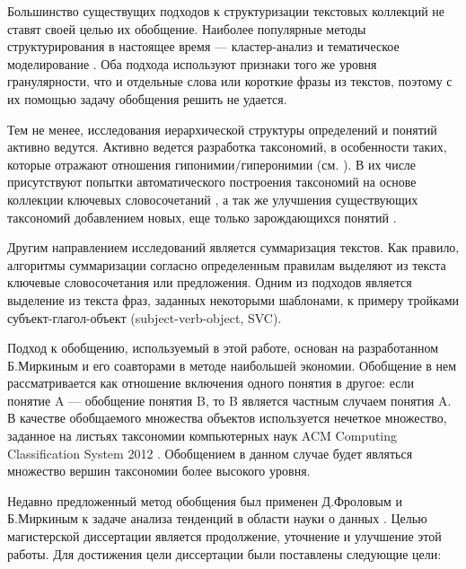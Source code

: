 \documentclass[12pt]{article}
\begin{document}
Большинство существущих подходов к структуризации текстовых коллекций не ставят своей целью их обобщение. Наиболее популярные методы структурирования в настоящее время --- кластер-анализ \cite{mirkin2005clustering} и тематическое моделирование \cite{blei2003latent, Papadimitriou:1998:LSI:275487.275505}. Оба подхода используют признаки того же уровня гранулярности, что и отдельные слова или короткие фразы из текстов, поэтому с их помощью задачу обобщения решить не удается.

Тем не менее, исследования иерархической структуры определений и понятий активно ведутся. Активно ведется разработка таксономий, в особенности таких, которые отражают отношения гипонимии/гиперонимии (см. \cite{snow2006semantic}). В их числе присутствуют попытки автоматического построения таксономий на основе коллекции ключевых словосочетаний \cite{Osborne2012, Osborne2015}, а так же улучшения существующих таксономий добавлением новых, еще только зарождающихся понятий \cite{vedula2018enriching}.

Другим направлением исследований является суммаризация текстов. Как правило, алгоритмы суммаризации согласно определенным правилам выделяют из текста ключевые словосочетания или предложения. Одним из подходов является выделение из текста фраз, заданных некоторыми шаблонами, к примеру тройками субъект-глагол-объект (subject-verb-object, SVC).

Подход к обобщению, используемый в этой работе, основан на разработанном Б.Миркиным и его соавторами в \cite{mirkin2003algorithms, mirkin2006aggregating, mirkin2018preprint} методе наибольшей экономии. Обобщение в нем рассматривается как отношение включения одного понятия в другое: если понятие A --- обобщение понятия B, то B является частным случаем понятия A. В качестве обобщаемого множества объектов используется нечеткое множество, заданное на листьях таксономии компьютерных наук ACM Computing Classification System 2012 \cite{associationforcomputingmachinery}. Обобщением в данном случае будет являться множество вершин таксономии более высокого уровня.

Недавно предложенный метод обобщения был применен Д.Фроловым и Б.Миркиным к задаче анализа тенденций в области науки о данных \cite{mirkin2018preprint}. Целью магистерской диссертации является продолжение, уточнение и улучшение этой работы. Для достижения цели диссертации были поставлены следующие цели:
\end{document}
